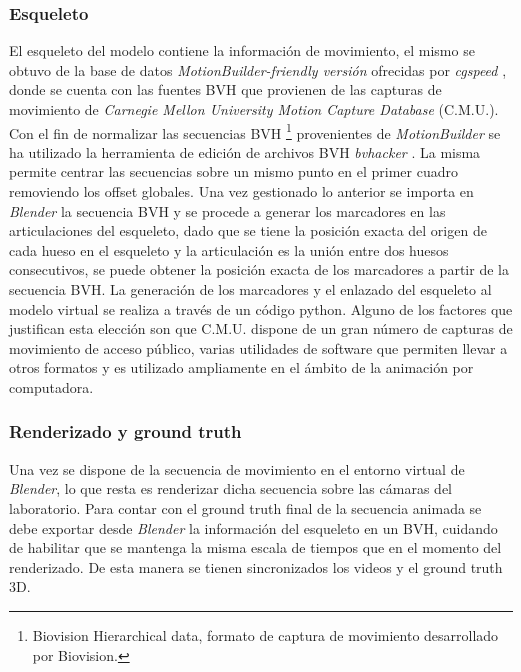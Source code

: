 

\subsubsection{Esqueleto}
El esqueleto del modelo contiene la información de movimiento, el mismo se obtuvo de la base de datos \textit{MotionBuilder-friendly versión} ofrecidas por \textit{cgspeed} \cite{cgspeed}, 
 donde se cuenta con las fuentes BVH que provienen de las capturas de movimiento de \textit{Carnegie Mellon University Motion Capture Database} (C.M.U.).       
 Con el fin de normalizar las secuencias BVH \footnote{Biovision Hierarchical data, formato de captura de movimiento desarrollado por Biovision.} provenientes de \textit{MotionBuilder} se ha utilizado la herramienta de edición de archivos BVH \textit{bvhacker} \cite{bvhacker}.
 La misma permite centrar las secuencias sobre un mismo punto en el primer cuadro removiendo los offset globales.
 Una vez gestionado lo anterior se importa en \textit{Blender} la secuencia BVH y se procede a generar los marcadores en las articulaciones del esqueleto, dado que se tiene la posición exacta del origen de cada hueso en el esqueleto y la articulación es la unión entre dos huesos consecutivos, se puede obtener la posición exacta de los marcadores a partir de la secuencia BVH.
 La generación de los marcadores y el enlazado del esqueleto al modelo virtual se realiza a través de un código python.
 Alguno de los factores que justifican esta elección son que C.M.U. dispone de un gran número de capturas de movimiento de acceso público, varias utilidades de software que permiten llevar a otros formatos y es utilizado ampliamente en el ámbito de la animación por computadora.
 
 \subsubsection{Renderizado y ground truth}
 Una vez se dispone de la secuencia de movimiento en el entorno virtual de \textit{Blender}, lo que resta es renderizar dicha secuencia sobre las cámaras del laboratorio. Para contar con el ground truth final de la secuencia animada se debe exportar desde \textit{Blender} la información del esqueleto en un BVH, cuidando de habilitar que se mantenga la misma escala de tiempos que en el momento del renderizado. De esta manera se tienen sincronizados los videos y el ground truth 3D.
 

